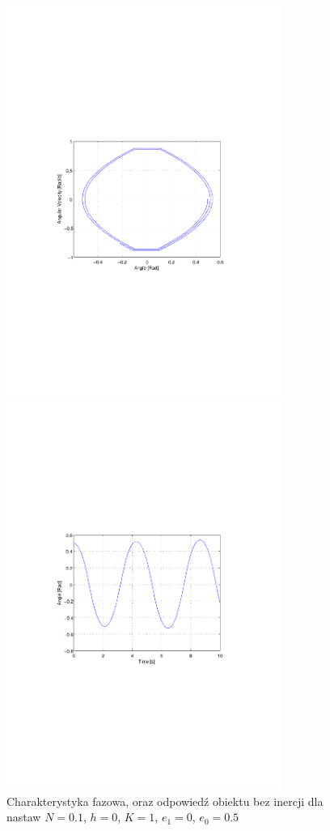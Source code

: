 \documentclass[12pt]{article}
\begin{document}
\begin{figure}[!htb]
	\begin{center}
		\includegraphics[trim=5cm 9cm 5cm 9cm,width=9cm]{../res/img/s1_T0_N0,1_h0_K1_e1-0_e0-0,5p.pdf}
	\end{center}
	
	\begin{center}
		\includegraphics[trim=5cm 9cm 5cm 9cm,width=9cm]{../res/img/s1_T0_N0,1_h0_K1_e1-0_e0-0,5r.pdf} 
	\end{center}
	\caption{Charakterystyka fazowa, oraz odpowiedź obiektu bez inercji dla
	nastaw $N=0.1$, $h=0$, $K=1$, $e_1=0$, $e_0=0.5$}
\end{figure}
\end{document}
